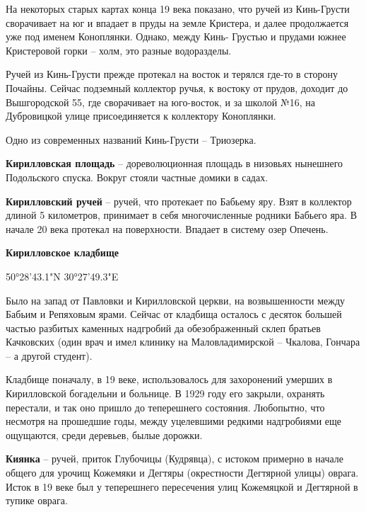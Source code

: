 На некоторых старых картах конца 19 века показано, что ручей из Кинь-Грусти сворачивает на юг и впадает в пруды на земле Кристера, и далее продолжается уже под именем Коноплянки. Однако, между Кинь- Грустью и прудами южнее Кристеровой горки – холм, это разные водоразделы.

Ручей из Кинь-Грусти прежде протекал на восток и терялся где-то в сторону Почайны. Сейчас подземный коллектор ручья, к востоку от прудов, доходит до Вышгородской 55, где сворачивает на юго-восток, и за школой №16, на Дубровицкой улице присоединяется к коллектору Коноплянки.

Одно из современных названий Кинь-Грусти – Триозерка.\\

\medskip

\textbf{Кирилловская площадь} – дореволюционная площадь в низовьях нынешнего Подольского спуска. Вокруг стояли частные домики в садах.\\

\medskip


\textbf{Кирилловский ручей} – ручей, что протекает по Бабьему яру. Взят в коллектор длиной 5 километров, принимает в себя многочисленные родники Бабьего яра. В начале 20 века протекал на поверхности. Впадает в систему озер Опечень.\\

\medskip

\textbf{Кирилловское кладбище} 

50°28'43.1"N 30°27'49.3"E

Было на запад от Павловки и Кирилловской церкви, на возвышенности между Бабьим и Репяховым ярами. Сейчас от кладбища осталось с десяток большей частью разбитых каменных надгробий да обезображенный склеп братьев Качковских (один врач и имел клинику на Маловладимирской – Чкалова, Гончара – а другой студент).

Кладбище поначалу, в 19 веке, использовалось для захоронений умерших в Кирилловской богадельни и больнице. В 1929 году его закрыли, охранять перестали, и так оно пришло до теперешнего состояния. Любопытно, что несмотря на прошедшие годы, между уцелевшими редкими надгробиями еще ощущаются, среди деревьев, былые дорожки.\\

\medskip

\textbf{Киянка} – ручей, приток Глубочицы (Кудрявца), с истоком примерно в начале общего для урочищ Кожемяки и Дегтяры (окрестности Дегтярной улицы) оврага. Исток в 19 веке был у теперешнего пересечения улиц Кожемяцкой и Дегтярной в тупике оврага.

